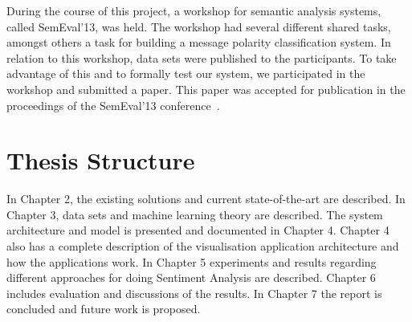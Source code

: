 During the course of this project, a workshop for semantic analysis systems, called SemEval'13, was held. The workshop had several different shared tasks, amongst others a task for building a message polarity classification system. In relation to this workshop, data sets were published to the participants. To take advantage of this and to formally test our system, we participated in the workshop and submitted a paper. This paper was accepted for publication in the proceedings of the SemEval'13 conference~\citep{selmer-EtAl:2013:SemEval-2013}.

\section{Thesis Structure}
\label{sec:structure}

In Chapter 2, the existing solutions and current state-of-the-art are described. In Chapter 3, data sets and machine learning theory are described. The system architecture and model is presented and documented in Chapter 4. Chapter 4 also has a complete description of the visualisation application architecture and how the applications work. In Chapter 5 experiments and results regarding different approaches for doing Sentiment Analysis are described. Chapter 6 includes evaluation and discussions of the results. In Chapter 7 the report is concluded and future work is proposed. 







